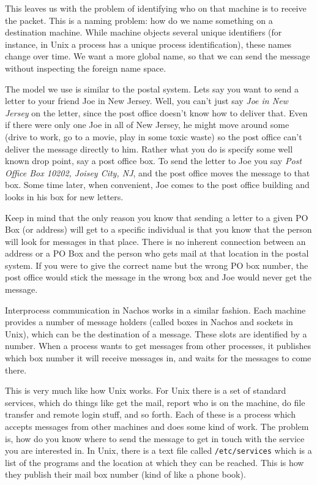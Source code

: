 This leaves us with the problem of identifying who on that
machine is to receive the packet.  This is a naming problem: how do we
name something on a destination machine.  While machine objects
several unique identifiers (for instance, in Unix a process has a
unique process identification), these names change over time.
We want a more global name, so that we can send the message without
inspecting the foreign name space.

The model we use is similar to the postal system.  Lets say you want to
send a letter to your friend Joe in New Jersey.  Well, you
can't just say {\it Joe in New Jersey} on the letter, since the post office
doesn't know how to deliver that.  Even if there were only one Joe in all of
New Jersey, he might move around some (drive to work, go to a movie, play
in some toxic waste) so the post office can't deliver the message directly
to him.  Rather what you do is specify some well known drop point, say
a post office box.  To send the letter to Joe you say 
{\it Post Office Box 10202, Joisey City, NJ}, 
and the post office moves the message to that box.  Some time
later, when convenient, Joe comes to the post office building and looks
in his box for new letters.  

Keep in mind that the only reason you know that sending a letter to a given
PO Box (or address) will get to a specific individual is that you know that
the person will look for messages in that place.  There is no inherent
connection between an address or a PO Box and the person who gets mail
at that location in the postal system.  If you were to give the correct
name but the wrong PO box number, the post office would stick the message
in the wrong box and Joe would never get the message.

Interprocess communication in Nachos works in a similar fashion.  Each
machine provides a number of message holders (called boxes in Nachos
and sockets in Unix), which can be the destination of a message.  These
slots are identified by a number.  When a process wants to get messages
from other processes, it publishes which box number it will receive messages
in, and waits for the messages to come there.

This is very much like how Unix works.  For Unix there is a set of standard
services, which do things like get the mail, report who is on the machine,
do file transfer and remote login stuff, and so forth.  Each of these is
a process which accepts messages from other machines and does some kind of
work.  The problem is, how do you know where to send the message to get
in touch with the service you are interested in.  In Unix, there is a 
text file called {\tt /etc/services} which is a list of the programs and
the location at which they can be reached.  This is how they publish their
mail box number (kind of like a phone book).

